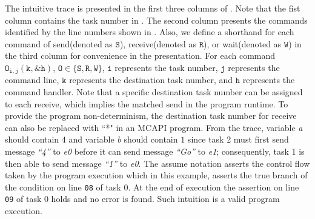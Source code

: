 The intuitive trace is presented in the first three columns of . Note that the fist column contains the task number in . The second column presents the commands identified by the line numbers shown in . Also, we define a shorthand for each command of send(denoted as $\mathtt{S}$), receive(denoted as $\mathtt{R}$), or wait(denoted as $\mathtt{W}$) in the third column for convenience in the presentation. For each command $\mathtt{O_{i,j}(k,\&h)}$, $\mathtt{O \in \{S,R,W\}}$, $\mathtt{i}$ represents the task number, $\mathtt{j}$ represents the command line, $\mathtt{k}$ represents the destination task number, and $\mathtt{h}$ represents the command handler. Note that a specific destination task number can be assigned to each receive, which implies the matched send in the program runtime. To provide the program non-determinism, the destination task number for receive can also be replaced with ``*" in an MCAPI program. From the trace, variable \textit{a} should contain $4$ and variable
\textit{b} should contain $1$ since task 2 must first send message \textit{``4''}
to \textit{e0} before it can send message \textit{``Go''} to \textit{e1};
consequently, task 1 is then able to send message \textit{``1''} to
\textit{e0}. The assume notation asserts the control flow taken by the program execution which in this example, asserts the true branch of the condition on line \texttt{08} of task 0.  At the end of execution the assertion on line \texttt{09}
of task 0 holds and no error is found. Such intuition is a valid
program execution.

